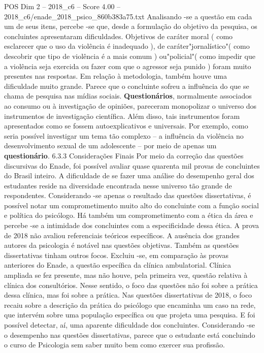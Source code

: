 \begin{textsample}{POS Dim 2 – 2018\_c6 – Score 4.00 – 2018\_c6/enade\_2018\_psico\_860b383a75.txt}
Analisando -se a questão em cada um de seus itens, percebe -se que, desde a formulação do objetivo da pesquisa, os concluintes apresentaram dificuldades.
Objetivos de caráter moral ( como esclarecer que o uso da violência é inadequado ), de caráter"jornalístico"( como descobrir que tipo de violência é a mais comum ) ou"policial"( como impedir que a violência seja exercida ou fazer com que o agressor seja punido ) foram muito presentes nas respostas.
Em relação à metodologia, também houve uma dificuldade muito grande.
Parece que o concluinte sofreu a influência do que se chama de pesquisa nas mídias sociais. \textbf{Questionários}, normalmente associados ao consumo ou à investigação de opiniões, pareceram monopolizar o universo dos instrumentos de investigação científica.
Além disso, tais instrumentos foram apresentados como se fossem autoexplicativos e universais.
Por exemplo, como seria possível investigar um tema tão complexo – a influência da violência no desenvolvimento sexual de um adolescente – por meio de apenas um \textbf{questionário}. 6.3.3 Considerações Finais Por meio da correção das questões discursivas do Enade, foi possível avaliar quase quarenta mil provas de concluintes do Brasil inteiro.
A dificuldade de se fazer uma análise do desempenho geral dos estudantes reside na diversidade encontrada nesse universo tão grande de respondentes.
Considerando -se apenas o resultado das questões dissertativas, é possível notar um comprometimento muito alto do concluinte com a função social e política do psicólogo.
Há também um comprometimento com a ética da área e percebe -se a intimidade dos concluintes com a especificidade dessa ética.
A prova de 2018 não avaliou referenciais teóricos específicos.
A ausência dos grandes autores da psicologia é notável nas questões objetivas.
Também as questões dissertativas tinham outros focos.
Excluiu -se, em comparação às provas anteriores do Enade, a questão específica da clínica ambulatorial.
Clínica ampliada se fez presente, mas não houve, pela primeira vez, questão relativa à clínica dos consultórios.
Nesse sentido, o foco das questões não foi sobre a prática dessa clínica, mas foi sobre a prática.
Nas questões dissertativas de 2018, o foco recaiu sobre a descrição da prática do psicólogo que encaminha um caso na rede, que intervém sobre uma população específica ou que projeta uma pesquisa.
E foi possível detectar, aí, uma aparente dificuldade dos concluintes.
Considerando -se o desempenho nas questões dissertativas, parece que o estudante está concluindo o curso de Psicologia sem saber muito bem como exercer sua profissão.

\end{textsample}
